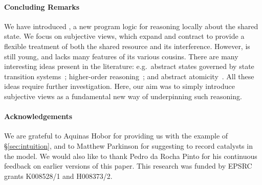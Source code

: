 \paragraph{Concluding Remarks}
%
We have introduced \colosl, a new program logic for reasoning locally
about the shared state. We focus on 
subjective views,  which expand and contract to 
provide a flexible
treatment of both the shared resource and its interference. 
However, \colosl is still young, and
lacks many features of its various cousins.  There are many
interesting ideas present in the literature: e.g.\ abstract states
governed by state transition systems~\cite{caresl}; higher-order
reasoning~\cite{icap}; and abstract atomicity~\cite{tada}. All these
ideas require further investigation. Here, our aim was to simply
introduce subjective views as a fundamental new way of underpinning such reasoning.



\paragraph{Acknowledgements}
We are grateful to Aquinas Hobor for providing us with the example of
\S\ref{sec:intuition}, and to Matthew Parkinson for
suggesting to record catalysts in the model. We would also like to thank
Pedro da Rocha Pinto for his continuous feedback on earlier versions
of this paper. This research was funded by EPSRC grants K008528/1 and
H008373/2.
